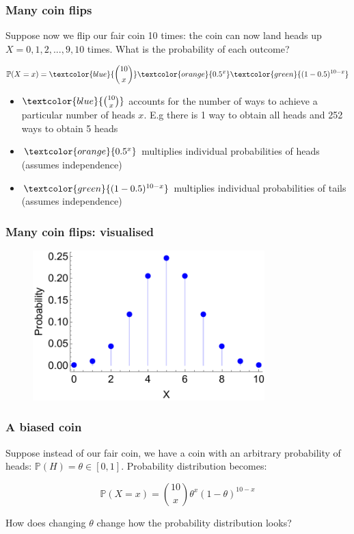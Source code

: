 \documentclass{beamer}
\begin{document}
	\begin{frame}
		\frametitle{Many coin flips}
		
		Suppose now we flip our fair coin 10 times: the coin can now land heads up $X=0, 1, 2, ..., 9, 10$ times. What is the probability of each outcome?
		
		\begin{equation}
		\mathbb{P}(X=x) = \textcolor{blue}{\binom{10}{x}} \textcolor{orange}{0.5^x} \textcolor{green}{(1 - 0.5)^{10-x}}
		\end{equation}
		
		\begin{itemize}
			\item $\textcolor{blue}{\binom{10}{x}}$ accounts for the number of ways to achieve a particular number of heads $x$. E.g there is 1 way to obtain all heads and 252 ways to obtain 5 heads
			\item $\textcolor{orange}{0.5^x}$ multiplies individual probabilities of heads (assumes independence)
			\item $\textcolor{green}{(1 - 0.5)^{10-x}}$ multiplies individual probabilities of tails (assumes independence)
		\end{itemize}
		
	\end{frame}
	
	\begin{frame}
		\frametitle{Many coin flips: visualised}
		
		\begin{figure}[ht]
			\includegraphics[width=0.8\textwidth]{./figures/binomial_10.pdf}
		\end{figure}
		
	\end{frame}
	
	\begin{frame}
		\frametitle{A biased coin}
		
		Suppose instead of our fair coin, we have a coin with an arbitrary probability of heads: $\mathbb{P}(H) = \theta\in [0, 1]$. Probability distribution becomes:
		
		\begin{equation}
		\mathbb{P}(X=x) = \binom{10}{x} \theta^x (1 - \theta)^{10 - x}
		\end{equation}
		
		How does changing $\theta$ change how the probability distribution looks?
		
	\end{frame}
	
\end{document}
